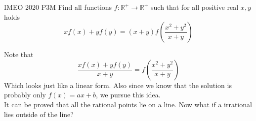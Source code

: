 {IMEO 2020 P3}{M}{
    Find all functions $f:\mathbb{R^+} \to \mathbb{R^+}$ such that for all
    positive real $x, y$ holds
    \[xf(x)+yf(y)=(x+y)f\left(\frac{x^2+y^2}{x+y}\right)\]
}

\begin{solution}
    Note that \[\frac{xf(x)+yf(y)}{x+y} = f\left(\frac{x^2+y^2}{x+y}\right)\] 
    Which looks just like a linear form. Also since we know that the solution
    is probably only $f(x) = ax+b$, we pursue this idea. \\

    It can be proved that all the rational points lie on a line. Now what if a
    irrational lies outside of the line?
\end{solution}

